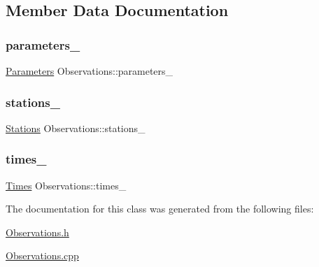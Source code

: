 \subsection{Member Data Documentation}
\mbox{\label{class_observations_ad86a168276ed510e2e56ac9a1e632848}} 
\subsubsection{\texorpdfstring{parameters\+\_\+}{parameters\_}}
{\footnotesize\ttfamily \mbox{\hyperlink{class_parameters}{Parameters}} Observations\+::parameters\+\_\+\hspace{0.3cm}{\ttfamily [protected]}}

\mbox{\label{class_observations_ad047997c0d421695f07be2edeef996ce}} 
\subsubsection{\texorpdfstring{stations\+\_\+}{stations\_}}
{\footnotesize\ttfamily \mbox{\hyperlink{class_stations}{Stations}} Observations\+::stations\+\_\+\hspace{0.3cm}{\ttfamily [protected]}}

\mbox{\label{class_observations_ab68b4495a78a2a30396cd42206d3e33c}} 
\subsubsection{\texorpdfstring{times\+\_\+}{times\_}}
{\footnotesize\ttfamily \mbox{\hyperlink{class_times}{Times}} Observations\+::times\+\_\+\hspace{0.3cm}{\ttfamily [protected]}}



The documentation for this class was generated from the following files\+:\begin{DoxyCompactItemize}
\item 
\mbox{\hyperlink{_observations_8h}{Observations.\+h}}\item 
\mbox{\hyperlink{_observations_8cpp}{Observations.\+cpp}}\end{DoxyCompactItemize}
